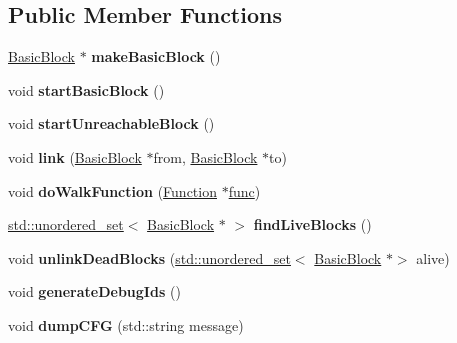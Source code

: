 \subsection*{Public Member Functions}
\begin{DoxyCompactItemize}
\item 
\mbox{\label{structwasm_1_1_c_f_g_walker_a175ad17e1d5e4fa40bf245d332487935}} 
\mbox{\hyperlink{structwasm_1_1_c_f_g_walker_1_1_basic_block}{Basic\+Block}} $\ast$ {\bfseries make\+Basic\+Block} ()
\item 
\mbox{\label{structwasm_1_1_c_f_g_walker_a71df4a1bfa7264d74d49d682f9b35b8b}} 
void {\bfseries start\+Basic\+Block} ()
\item 
\mbox{\label{structwasm_1_1_c_f_g_walker_af3f898139059e0721c01e996f01ff16d}} 
void {\bfseries start\+Unreachable\+Block} ()
\item 
\mbox{\label{structwasm_1_1_c_f_g_walker_a98df4b2df06334d30b0f848f04faebf3}} 
void {\bfseries link} (\mbox{\hyperlink{structwasm_1_1_c_f_g_walker_1_1_basic_block}{Basic\+Block}} $\ast$from, \mbox{\hyperlink{structwasm_1_1_c_f_g_walker_1_1_basic_block}{Basic\+Block}} $\ast$to)
\item 
\mbox{\label{structwasm_1_1_c_f_g_walker_a1331a1b36457fd888c88e0997115b0d8}} 
void {\bfseries do\+Walk\+Function} (\mbox{\hyperlink{classwasm_1_1_function}{Function}} $\ast$\mbox{\hyperlink{structfunc}{func}})
\item 
\mbox{\label{structwasm_1_1_c_f_g_walker_ac82d95e490350924c50ca67dbadbb120}} 
\mbox{\hyperlink{classstd_1_1unordered__set}{std\+::unordered\+\_\+set}}$<$ \mbox{\hyperlink{structwasm_1_1_c_f_g_walker_1_1_basic_block}{Basic\+Block}} $\ast$ $>$ {\bfseries find\+Live\+Blocks} ()
\item 
\mbox{\label{structwasm_1_1_c_f_g_walker_a71140cde5c2af8144f297c944a128365}} 
void {\bfseries unlink\+Dead\+Blocks} (\mbox{\hyperlink{classstd_1_1unordered__set}{std\+::unordered\+\_\+set}}$<$ \mbox{\hyperlink{structwasm_1_1_c_f_g_walker_1_1_basic_block}{Basic\+Block}} $\ast$$>$ alive)
\item 
\mbox{\label{structwasm_1_1_c_f_g_walker_afe556c459d0666f0be8649ca8b5ffc30}} 
void {\bfseries generate\+Debug\+Ids} ()
\item 
\mbox{\label{structwasm_1_1_c_f_g_walker_aef223af69f6c58311bac02f8af1b96ce}} 
void {\bfseries dump\+C\+FG} (std\+::string message)
\end{DoxyCompactItemize}
